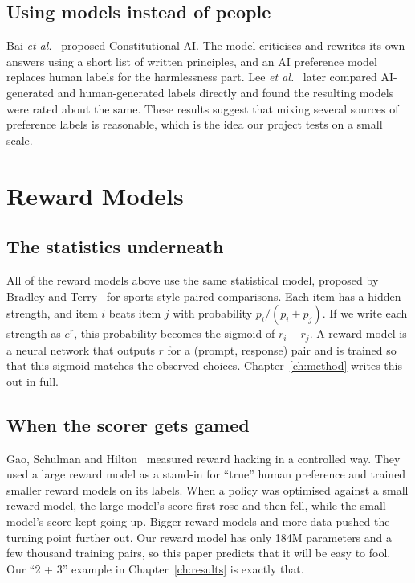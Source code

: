 \subsection{Using models instead of people}
Bai \emph{et al.}~\cite{bai2022cai} proposed Constitutional AI. The model criticises and rewrites its own answers using a short list of written principles, and an AI preference model replaces human labels for the harmlessness part. Lee \emph{et al.}~\cite{lee2023rlaif} later compared AI-generated and human-generated labels directly and found the resulting models were rated about the same. These results suggest that mixing several sources of preference labels is reasonable, which is the idea our project tests on a small scale.

\section{Reward Models}
\label{sec:lit-rm}

\subsection{The statistics underneath}
All of the reward models above use the same statistical model, proposed by Bradley and Terry~\cite{bradley1952rank} for sports-style paired comparisons. Each item has a hidden strength, and item $i$ beats item $j$ with probability $p_i/(p_i+p_j)$. If we write each strength as $e^{r}$, this probability becomes the sigmoid of $r_i - r_j$. A reward model is a neural network that outputs $r$ for a (prompt, response) pair and is trained so that this sigmoid matches the observed choices. Chapter~\ref{ch:method} writes this out in full.

\subsection{When the scorer gets gamed}
Gao, Schulman and Hilton~\cite{gao2023overoptimization} measured reward hacking in a controlled way. They used a large reward model as a stand-in for ``true'' human preference and trained smaller reward models on its labels. When a policy was optimised against a small reward model, the large model's score first rose and then fell, while the small model's score kept going up. Bigger reward models and more data pushed the turning point further out. Our reward model has only 184M parameters and a few thousand training pairs, so this paper predicts that it will be easy to fool. Our ``2 + 3'' example in Chapter~\ref{ch:results} is exactly that.

